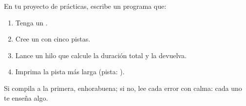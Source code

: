\begin{ejercicio}
En tu proyecto de prácticas, escribe un programa que:
\begin{enumerate}
  \item Tenga un .
  \item Cree un  con cinco pistas.
  \item Lance un hilo que calcule la duración total y la devuelva.
  \item Imprima la pista más larga (pista: ).
\end{enumerate}
Si compila a la primera, enhorabuena; si no, lee cada error con calma: cada uno te enseña algo.
\end{ejercicio}

